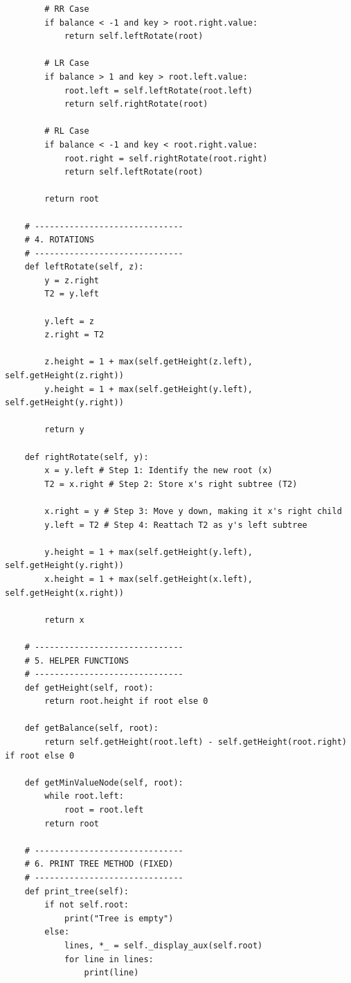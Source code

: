 \begin{lstlisting}
        # RR Case
        if balance < -1 and key > root.right.value:
            return self.leftRotate(root)

        # LR Case
        if balance > 1 and key > root.left.value:
            root.left = self.leftRotate(root.left)
            return self.rightRotate(root)

        # RL Case
        if balance < -1 and key < root.right.value:
            root.right = self.rightRotate(root.right)
            return self.leftRotate(root)

        return root

    # ------------------------------
    # 4. ROTATIONS
    # ------------------------------
    def leftRotate(self, z):
        y = z.right
        T2 = y.left

        y.left = z
        z.right = T2

        z.height = 1 + max(self.getHeight(z.left), self.getHeight(z.right))
        y.height = 1 + max(self.getHeight(y.left), self.getHeight(y.right))

        return y

    def rightRotate(self, y):
        x = y.left # Step 1: Identify the new root (x)
        T2 = x.right # Step 2: Store x's right subtree (T2)

        x.right = y # Step 3: Move y down, making it x's right child
        y.left = T2 # Step 4: Reattach T2 as y's left subtree

        y.height = 1 + max(self.getHeight(y.left), self.getHeight(y.right))
        x.height = 1 + max(self.getHeight(x.left), self.getHeight(x.right))

        return x

    # ------------------------------
    # 5. HELPER FUNCTIONS
    # ------------------------------
    def getHeight(self, root):
        return root.height if root else 0

    def getBalance(self, root):
        return self.getHeight(root.left) - self.getHeight(root.right) if root else 0

    def getMinValueNode(self, root):
        while root.left:
            root = root.left
        return root

    # ------------------------------
    # 6. PRINT TREE METHOD (FIXED)
    # ------------------------------
    def print_tree(self):
        if not self.root:
            print("Tree is empty")
        else:
            lines, *_ = self._display_aux(self.root)
            for line in lines:
                print(line)


\end{lstlisting}
